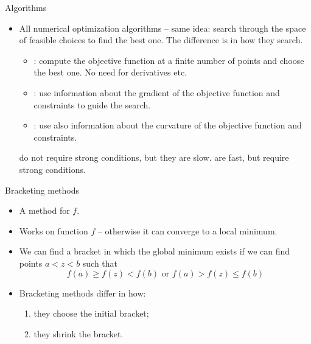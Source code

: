 \documentclass[11pt,xcolor={dvipsnames},aspectratio=159,hyperref={pdftex,pdfpagemode=UseNone,hidelinks,pdfdisplaydoctitle=true},usepdftitle=false]{beamer}
\begin{document}
\begin{frame}{Algorithms}
    \begin{itemize} 
    \item All numerical optimization algorithms -- same idea: search through the space of feasible choices to find the best one. The difference is in how they search.
    \begin{itemize}
        \item {}: compute the objective function at a finite number of points and choose the best one. No need for derivatives etc.
        \item {}: use information about the gradient of the objective function and constraints to guide the search.
        \item {}: use also information about the curvature of the objective function and constraints.
    \end{itemize}    
 do not require strong conditions, but they are slow.  are fast, but require strong conditions.
\end{itemize}
\end{frame}

\begin{frame}
    \end{frame}

    \begin{frame}{Bracketing methods}
        \begin{itemize}
        \item A  method for  $f$.
\item Works  on  function $f$ -- otherwise it can converge to a local minimum.
\item We can find a bracket in which the global minimum exists if we can find points $a < z < b$ such that
$$f(a) \geq f(z) < f(b) \text{ or } f(a) > f(z) \leq f(b)$$
\item Bracketing methods differ in how:
\begin{enumerate}
\item they choose the initial bracket;
\item they shrink the bracket.
\end{enumerate}
        \end{itemize}
\end{frame}
\end{document}
